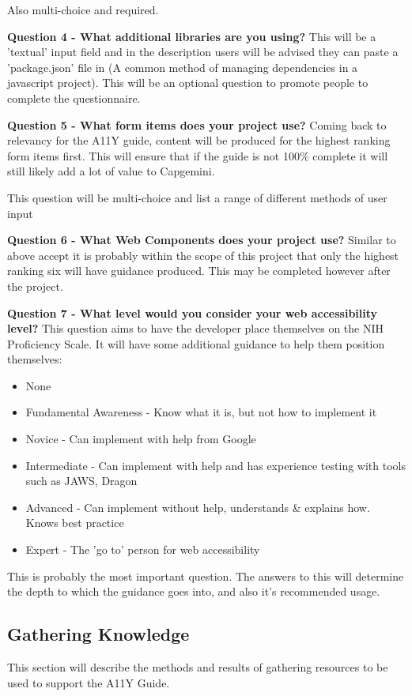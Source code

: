 Also multi-choice and required.

\textbf{Question 4 - What additional libraries are you using?}
This will be a 'textual' input field and in the description users will be
advised they can paste a 'package.json' file in (A common method of managing
dependencies in a javascript project). This will be an optional question to
promote people to complete the questionnaire.

\textbf{Question 5 - What form items does your project use?}
Coming back to relevancy for the A11Y guide, content will be produced for the
highest ranking form items first. This will ensure that if the guide is not
100\% complete it will still likely add a lot of value to Capgemini.

This question will be multi-choice and list a range of different methods of
user input

\textbf{Question 6 - What Web Components does your project use?}
Similar to above accept it is probably within the scope of this project that
only the highest ranking six will have guidance produced. This may be
completed however after the project.

\textbf{Question 7 - What level would you consider your web accessibility
level?}
This question aims to have the developer place themselves on the NIH
Proficiency Scale. It will have some additional guidance to help them
position themselves:
\begin{itemize}
\item None
\item Fundamental Awareness - Know what it is, but not how to implement it
\item Novice - Can implement with help from Google
\item Intermediate - Can implement with help and has experience testing with tools such as JAWS, Dragon
\item Advanced  - Can implement without help, understands \& explains how.
Knows best practice
\item Expert - The 'go to' person for web accessibility
\end{itemize}

This is probably the most important question. The answers to this will
determine the depth to which the guidance goes into, and also it's
recommended usage.

\subsection{Gathering Knowledge}
This section will describe the methods and results of gathering resources to
be used to support the A11Y Guide.

